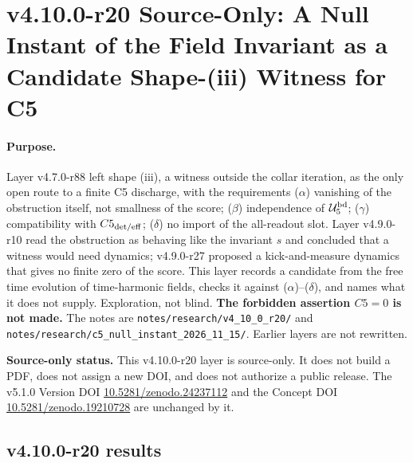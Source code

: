 
\clearpage
\section*{v4.10.0-r20 Source-Only: A Null Instant of the Field Invariant as a Candidate Shape-(iii) Witness for C5}
\label{sec:v4100-r20-c5-null-instant}

\paragraph{Purpose.}
Layer v4.7.0-r88 left shape (iii), a witness outside the collar iteration, as the only open route to a finite C5 discharge, with
the requirements (\(\alpha\)) vanishing of the obstruction itself, not smallness of the score; (\(\beta\)) independence of
\(\mathcal U_5^{\rm bd}\); (\(\gamma\)) compatibility with \(C5_{\rm det/eff}\); (\(\delta\)) no import of the all-readout slot.  Layer
v4.9.0-r10 read the obstruction as behaving like the invariant \(s\) and concluded that a witness would need dynamics; v4.9.0-r27
proposed a kick-and-measure dynamics that gives no finite zero of the score.  This layer records a candidate from the free time
evolution of time-harmonic fields, checks it against (\(\alpha\))--(\(\delta\)), and names what it does not supply.  Exploration, not
blind.  \textbf{The forbidden assertion \(C5=0\) is not made.}  The notes are
\texttt{notes/\allowbreak research/\allowbreak v4\_10\_0\_r20/} and
\texttt{notes/\allowbreak research/\allowbreak c5\_null\_instant\_2026\_11\_15/}.  Earlier layers are not rewritten.

\noindent\textbf{Source-only status.}
This v4.10.0-r20 layer is source-only.  It does not build a PDF, does not assign a new DOI,
and does not authorize a public release.  The v5.1.0 Version DOI
\href{https://doi.org/10.5281/zenodo.24237112}{10.5281/zenodo.24237112} and the Concept DOI
\href{https://doi.org/10.5281/zenodo.19210728}{10.5281/zenodo.19210728} are unchanged by it.

\subsection*{v4.10.0-r20 results}
\label{subsec:v4100-r20-results}


